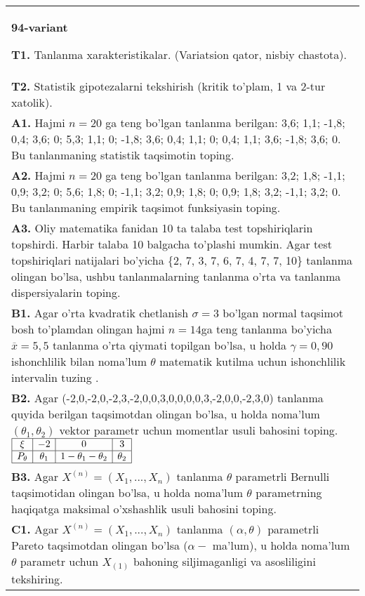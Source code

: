 \documentclass{article}
\begin{document}
\begin{tabular}{m{17cm}}
\textbf{94-variant}
\newline

\textbf{T1.} 
Tanlanma xarakteristikalar. (Variatsion qator, nisbiy chastota).
\\
\textbf{T2.} 
Statistik gipotezalarni tekshirish (kritik to'plam, 1 va 2-tur xatolik).
\\
\textbf{A1.} 
Hajmi \(n = 20\) ga teng bo'lgan tanlanma berilgan: 3,6; 1,1; -1,8; 0,4; 3,6; 0; 5,3; 1,1; 0; -1,8; 3,6; 0,4; 1,1; 0; 0,4; 1,1; 3,6; -1,8; 3,6; 0. Bu tanlanmaning statistik taqsimotin toping.
\\
\textbf{A2.} 
Hajmi \(n = 20\) ga teng bo'lgan tanlanma berilgan: 3,2; 1,8; -1,1; 0,9; 3,2; 0; 5,6; 1,8; 0; -1,1; 3,2; 0,9; 1,8; 0; 0,9; 1,8; 3,2; -1,1; 3,2; 0. Bu tanlanmaning empirik taqsimot funksiyasin toping.
\\
\textbf{A3.} 
Oliy matematika fanidan 10 ta talaba test topshiriqlarin topshirdi. Harbir talaba 10 balgacha to'plashi mumkin. Agar test topshiriqlari natijalari bo'yicha \{2, 7, 3, 7, 6, 7, 4, 7, 7, 10\} tanlanma olingan bo'lsa, ushbu tanlanmalarning tanlanma o'rta va tanlanma dispersiyalarin toping.
\\
\textbf{B1.} 
Agar o'rta kvadratik chetlanish \(\sigma = 3\) bo'lgan normal taqsimot bosh to'plamdan olingan hajmi \(n = 14\)ga teng tanlanma bo'yicha \(\overline{x} = 5,5\) tanlanma o'rta qiymati topilgan bo'lsa, u holda \(\gamma = 0,90\) ishonchlilik bilan noma'lum \(\theta\) matematik kutilma uchun ishonchlilik intervalin tuzing .
\\
\textbf{B2.} 
Agar (-2,0,-2,0,-2,3,-2,0,0,3,0,0,0,0,3,-2,0,0,-2,3,0) tanlanma quyida berilgan taqsimotdan olingan bo'lsa, u holda noma'lum \(\left( \theta_{1},\theta_{2} \right)\) vektor parametr uchun momentlar usuli bahosini toping.
$\begin{array}{|c|c|c|c|}
    \hline
    \xi & - 2 & 0 & 3\\
    \hline
    P_{\theta} & \theta_{1} & 1 - \theta_{1} - \theta_{2} & \theta_{2} \\
    \hline
\end{array}$
\\
\textbf{B3.} 
Agar \(X^{(n)} = \left( X_{1},...,X_{n} \right)\) tanlanma \(\theta\) parametrli Bernulli taqsimotidan olingan bo'lsa, u holda noma'lum \(\theta\) parametrning haqiqatga maksimal o'xshashlik usuli bahosini toping.
\\
\textbf{C1.} 
Agar \(X^{(n)} = \left( X_{1},...,X_{n} \right)\) tanlanma \((\alpha,\theta)\) parametrli Pareto taqsimotdan olingan bo'lsa (\(\alpha -\) ma'lum), u holda noma'lum \(\theta\) parametr uchun \(X_{(1)}\) bahoning siljimaganligi va asosliligini tekshiring.

\end{tabular}
\end{document}
